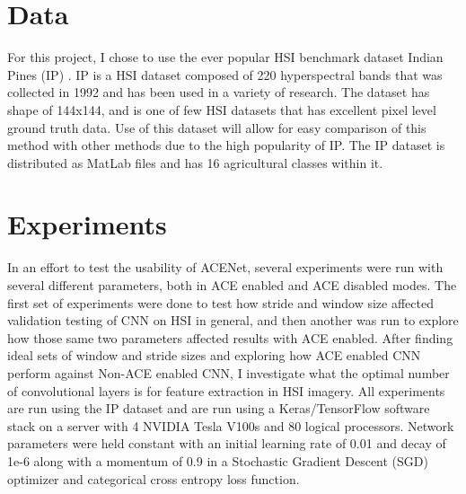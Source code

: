 \documentclass[12pt]{article}
\begin{document}
%
\section{Data}\label{sec:data}
For this project, I chose to use the ever popular HSI benchmark dataset Indian Pines (IP) \cite{IP}.
%
IP is a HSI dataset composed of 220 hyperspectral bands that was collected in 1992 and has been used in a variety of research.
%
The dataset has shape of 144x144, and is one of few HSI datasets that has excellent pixel level ground truth data.
%
Use of this dataset will allow for easy comparison of this method with other methods due to the high popularity of IP.
%
The IP dataset is distributed as MatLab files and has 16 agricultural classes within it.

%
\section{Experiments}\label{sec:experiments}

In an effort to test the usability of ACENet, several experiments were run with several different parameters, both in ACE enabled and ACE disabled modes. 
%
The first set of experiments were done to test how stride and window size affected validation testing of CNN on HSI in general, and then another was run to explore how those same two parameters affected results with ACE enabled.
%
After finding ideal sets of window and stride sizes and exploring how ACE enabled CNN perform against Non-ACE enabled CNN, I investigate what the optimal number of convolutional layers is for feature extraction in HSI imagery.
%
All experiments are run using the IP dataset and are run using a Keras/TensorFlow software stack on a server with 4 NVIDIA Tesla V100s and 80 logical processors.
%
Network parameters were held constant with an initial learning rate of 0.01 and decay of 1e-6 along with a momentum of 0.9 in a Stochastic Gradient Descent (SGD) optimizer and categorical cross entropy loss function.
% 
\end{document}
